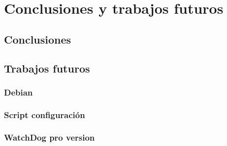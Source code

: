 \chapter{Conclusiones y trabajos futuros}
\label{capx}

\section{Conclusiones}
\section{Trabajos futuros}
	\subsection{Debian}
	\subsection{Script configuración}
	\subsection{WatchDog pro version}
